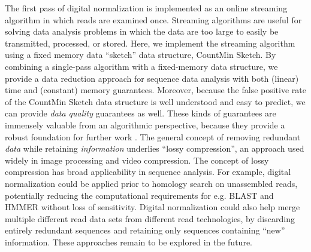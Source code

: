 \documentclass[10pt]{article}
\begin{document}
The first pass of digital normalization is implemented as an online
streaming algorithm in which reads are examined once.  Streaming
algorithms are useful for solving data analysis problems in which
the data are too large to easily be transmitted, processed, or
stored.  Here, we implement the streaming algorithm using a fixed
memory data ``sketch'' data structure, CountMin Sketch.  By combining
a single-pass algorithm with a fixed-memory data structure, we provide
a data reduction approach for sequence data analysis with both
(linear) time and (constant) memory guarantees. Moreover, because the
false positive rate of the CountMin Sketch data structure is well
understood and easy to predict, we can provide {\em data quality}
guarantees as well.  These kinds of guarantees are immensely
valuable from an algorithmic perspective, because they provide a
robust foundation for further work \cite{muthukrishnan2005data}.
%
The general concept of removing redundant {\em data} while retaining
{\em information} underlies ``lossy compression'', an approach used
widely in image processing and video compression.  The concept of
lossy compression has broad applicability in sequence analysis.
For example, digital normalization could be applied prior to homology
search on unassembled reads, potentially reducing the computational
requirements for e.g. BLAST and HMMER without loss of sensitivity.
Digital normalization could also help merge multiple different read
data sets from different read technologies, by discarding
entirely redundant sequences and retaining only sequences containing
``new'' information.  These approaches remain to be explored in the future.




\end{document}
